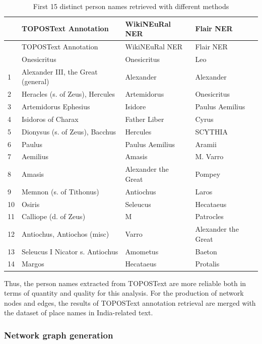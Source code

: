 \documentclass[
  12pt,
]{article}
\begin{document}
\hypertarget{tbl-per_name_compare}{}
\begin{longtable}[]{@{}llll@{}}
\caption{\label{tbl-per_name_compare}First 15 distinct person names
retrieved with different methods}\tabularnewline
\toprule\noalign{}
& TOPOSText Annotation & WikiNEuRal NER & Flair NER \\
\midrule\noalign{}
\endfirsthead
\toprule\noalign{}
& TOPOSText Annotation & WikiNEuRal NER & Flair NER \\
\midrule\noalign{}
\endhead
\bottomrule\noalign{}
\endlastfoot
0 & Onesicritus & Onesicritus & Leo \\
1 & Alexander III, the Great (general) & Alexander & Alexander \\
2 & Heracles (s. of Zeus), Hercules & Artemidorus & Onesicritus \\
3 & Artemidorus Ephesius & Isidore & Paulus Aemilius \\
4 & Isidoros of Charax & Father Liber & Cyrus \\
5 & Dionysus (s. of Zeus), Bacchus & Hercules & SCYTHIA \\
6 & Paulus & Paulus Aemilius & Aramii \\
7 & Aemilius & Amasis & M. Varro \\
8 & Amasis & Alexander the Great & Pompey \\
9 & Memnon (s. of Tithonus) & Antiochus & Laros \\
10 & Osiris & Seleucus & Hecataeus \\
11 & Calliope (d. of Zeus) & M & Patrocles \\
12 & Antiochus, Antiochos (misc) & Varro & Alexander the Great \\
13 & Seleucus I Nicator s. Antiochus & Amometus & Baeton \\
14 & Margos & Hecataeus & Protalis \\
\end{longtable}

Thus, the person names extracted from TOPOSText are more reliable both
in terms of quantity and quality for this analysis. For the production
of network nodes and edges, the results of TOPOSText annotation
retrieval are merged with the dataset of place names in India-related
text.

\hypertarget{network-graph-generation}{%
\subsubsection{Network graph
generation}\label{network-graph-generation}}
\end{document}
